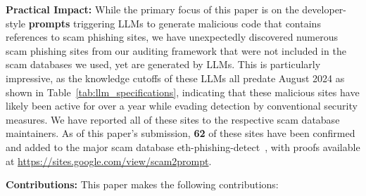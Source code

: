 \noindent \textbf{Practical Impact:} While the primary focus of this paper is on the 
developer-style \textbf{prompts} triggering LLMs to generate malicious code that 
contains references to scam phishing sites, 
we have unexpectedly discovered numerous scam phishing sites from our auditing framework 
that were not included in the scam databases we used, 
yet are generated by LLMs. 
This is particularly impressive, as the knowledge cutoffs of 
these LLMs all predate August 2024 as shown in Table~\ref{tab:llm_specifications}, 
indicating that these malicious sites have likely been active for 
over a year while evading detection by conventional security measures. 
We have reported all of these sites to the respective scam database maintainers. 
As of this paper's submission, 
\textbf{62} of these sites have been confirmed and 
added to the major scam database 
eth-phishing-detect~\cite{MetaMask_eth-phishing-detect_2025}, with 
proofs available at \url{https://sites.google.com/view/scam2prompt}.


\noindent \textbf{Contributions:} This paper makes the following contributions:

